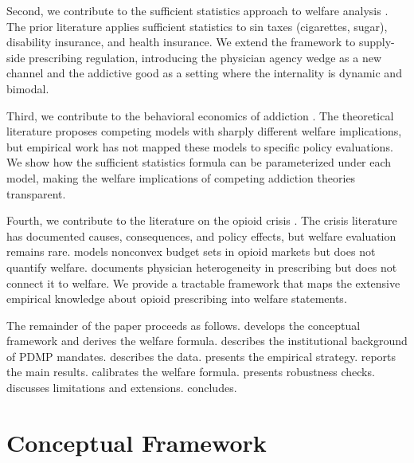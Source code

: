 \documentclass[12pt]{article}
\begin{document}
Second, we contribute to the sufficient statistics approach to welfare analysis \citep{chetty2009sufficient, allcott2019regressive, hendren2020unified}. The prior literature applies sufficient statistics to sin taxes (cigarettes, sugar), disability insurance, and health insurance. We extend the framework to supply-side prescribing regulation, introducing the physician agency wedge as a new channel and the addictive good as a setting where the internality is dynamic and bimodal.

Third, we contribute to the behavioral economics of addiction \citep{becker1988theory, gruber2001tobacco, bernheim2004addiction, o2011behavioral, gruber2001risky}. The theoretical literature proposes competing models with sharply different welfare implications, but empirical work has not mapped these models to specific policy evaluations. We show how the sufficient statistics formula can be parameterized under each model, making the welfare implications of competing addiction theories transparent.

Fourth, we contribute to the literature on the opioid crisis \citep{case2015rising, currie2019decreasing, ruhm2019drivers, volkow2016opioid, kolodny2015prescription, alpert2022origins}. The crisis literature has documented causes, consequences, and policy effects, but welfare evaluation remains rare. \citet{mulligan2020determinants} models nonconvex budget sets in opioid markets but does not quantify welfare. \citet{schnell2017physician} documents physician heterogeneity in prescribing but does not connect it to welfare. We provide a tractable framework that maps the extensive empirical knowledge about opioid prescribing into welfare statements.

The remainder of the paper proceeds as follows.  develops the conceptual framework and derives the welfare formula.  describes the institutional background of PDMP mandates.  describes the data.  presents the empirical strategy.  reports the main results.  calibrates the welfare formula.  presents robustness checks.  discusses limitations and extensions.  concludes.


\section{Conceptual Framework}\label{sec:framework}
\end{document}
